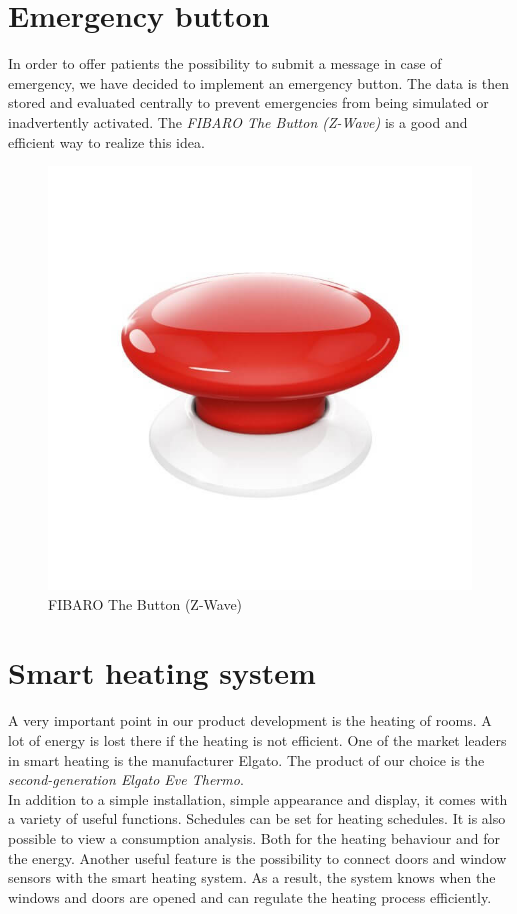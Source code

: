 \section{Emergency button}
In order to offer patients the possibility to submit a message in case of emergency, we have decided to implement an emergency button. The data is then stored and evaluated centrally to prevent emergencies from being simulated or inadvertently activated. The \textit{FIBARO The Button (Z-Wave)} is a good and efficient way to realize this idea.

\begin{figure}[h]
	\centering
	\includegraphics[width=.4\textwidth]{images/CostAnalysis/fibaroEmergency} 
	\caption[FIBARO The Button (Z-Wave)]{FIBARO The Button (Z-Wave)\footnotemark}
	\label{fig:fibaroEmergency}
\end{figure}
\section{Smart heating system}
\label{sec:smartHeating}
A very important point in our product development is the heating of rooms. A lot of energy is lost there if the heating is not efficient. One of the market leaders in smart heating is the manufacturer Elgato. The product of our choice is the \textit{second-generation Elgato Eve Thermo}. 
\\
In addition to a simple installation, simple appearance and display, it comes with a variety of useful functions. Schedules can be set for heating schedules. It is also possible to view a consumption analysis. Both for the heating behaviour and for the energy. Another useful feature is the possibility to connect doors and window sensors with the smart heating system. As a result, the system knows when the windows and doors are opened and can regulate the heating process efficiently.

